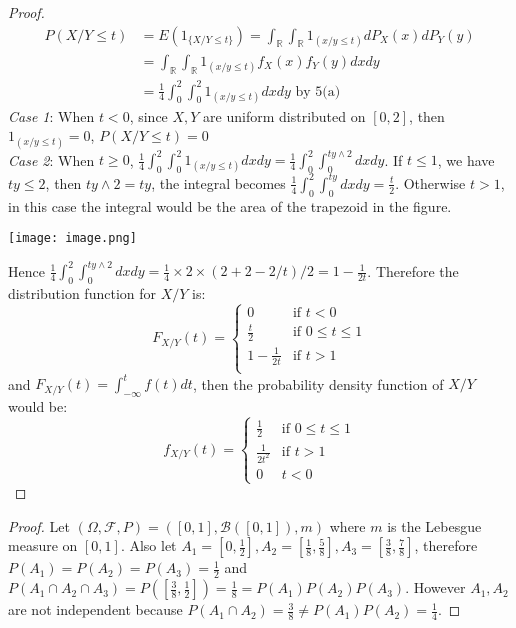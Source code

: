 \documentclass[10pt]{article}
\newenvironment{problem}[2][Problem]{\begin{trivlist}
\item[\hskip \labelsep {\bfseries #1}\hskip \labelsep {\bfseries #2.}]}{\end{trivlist}}
\begin{document}
\begin{problem}{5(b)}
\end{problem}

\begin{proof}
\begin{equation}
\begin{split}
P(X/Y \le t) &= E(1_{\{X/Y\le t\}}) = \int_{\mathbb{R}}\int_{\mathbb{R}} 1_{(x/y\le t)}dP_{X}(x)dP_{Y}(y) \\
&= \int_{\mathbb{R}}\int_{\mathbb{R}} 1_{(x/y\le t)}f_{X}(x)f_{Y}(y)dxdy \\
&= \frac{1}{4}\int_{0}^{2}\int_{0}^{2} 1_{(x/y\le t)}dxdy \text{ by 5(a)}
\end{split}
\end{equation}
\textit{Case 1}: When $t < 0$, since $X,Y$ are uniform distributed on $[0,2]$, then $1_{(x/y\le t)} = 0$, $P(X/Y \le t) = 0$\\
\textit{Case 2}: When $t \ge 0$, $\frac{1}{4}\int_{0}^{2}\int_{0}^{2} 1_{(x/y\le t)}dxdy = \frac{1}{4}\int_{0}^{2}\int_{0}^{ty \wedge 2}dxdy$. If $t \le 1$, we have $ty \le 2$, then $ty \wedge 2 = ty$, the integral becomes $\frac{1}{4}\int_{0}^{2}\int_{0}^{ty}dxdy = \frac{t}{2}$. Otherwise $t > 1$, in this case the integral would be the area of the trapezoid in the figure.\\
\begin{center}
\texttt{[image: image.png]}\\
\end{center}
Hence $\frac{1}{4}\int_{0}^{2}\int_{0}^{ty \wedge 2}dxdy = \frac{1}{4} \times 2\times(2 + 2 - 2/t)/2= 1 - \frac{1}{2t}$.
Therefore the distribution function for $X/Y$ is:
\[F_{X/Y}(t)  = 
  \begin{cases}
  0 & \text{if $t < 0$} \\
  \frac{t}{2} & \text{if $0 \le t \le 1$} \\
  1 - \frac{1}{2t} & \text{if $t > 1$} \\
  \end{cases}
\]
and $F_{X/Y}(t) = \int_{-\infty}^{t}f(t)dt$, then the probability density function of $X/Y$ would be:
\[f_{X/Y}(t)  = 
  \begin{cases}
  \frac{1}{2} & \text{if $0 \le t \le 1$} \\
  \frac{1}{2t^2} & \text{if $t > 1$} \\
  0 & \text{$t < 0$}
  \end{cases}
\]
\end{proof}


\begin{problem}{6}
\end{problem}
 
\begin{proof}
Let $(\Omega, \mathcal{F}, P) = ([0,1], \mathcal{B}([0,1]), m)$ where $m$ is the Lebesgue measure on $[0,1]$. Also let $A_{1}=[0,\frac{1}{2}], A_{2}=[\frac{1}{8},\frac{5}{8}], A_{3}=[\frac{3}{8},\frac{7}{8}]$, therefore $P(A_{1})=P(A_{2})=P(A_{3}) = \frac{1}{2}$ and $P(A_{1}\cap A_{2}\cap A_{3}) = P([\frac{3}{8}, \frac{1}{2}]) = \frac{1}{8} = P(A_{1})P(A_{2})P(A_{3})$. However $A_{1}, A_{2}$ are not independent because $P(A_{1}\cap A_{2}) = \frac{3}{8} \neq P(A_{1})P(A_{2}) = \frac{1}{4}$.
\end{proof}
\end{document}
